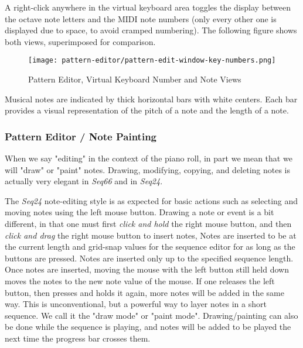    A right-click anywhere in the virtual keyboard area toggles the display
   between the octave note letters and the MIDI note numbers (only every other
   one is displayed due to space, to avoid cramped numbering).
   The following figure shows both views, superimposed for comparison.

\begin{figure}[H]
   \centering 
   \texttt{[image: pattern-editor/pattern-edit-window-key-numbers.png]}
   \caption{Pattern Editor, Virtual Keyboard Number and Note Views}
   \label{fig:pattern_editor_key_numbers}
\end{figure}

   Musical notes are indicated by thick horizontal bars with white
   centers.  Each bar provides
   a visual representation of the pitch of a note and the length of a note.

\subsubsection{Pattern Editor / Note Painting}
\label{subsubsec:pattern_editor_note_painting}

   When we say "editing" in the context of the piano roll, in part we mean that
   we will "draw"
   or "paint"
    notes.
   Drawing, modifying, copying, and deleting
   notes is actually very elegant in \textsl{Seq66} and in
   \textsl{Seq24}.

   The \textsl{Seq24} note-editing style is as expected for basic
   actions such as selecting and moving notes using the left mouse button.
   Drawing a note or event is a bit different, in that one must first
   \textsl{click and hold} the right mouse button, and then
   \textsl{click and drag} the right mouse button to insert notes,
   Notes are inserted to be at the current length and grid-snap values for
   the sequence editor for as long as the buttons are pressed.
   Notes are inserted only up to the specified sequence length.
   Once notes are inserted, moving the mouse with the left button still
   held down moves the notes to the new note value of the mouse.
   If one releases the left button, then presses and holds it again,
   more notes will be added in the same way.
   This is unconventional, but a powerful way to layer notes in a short
   sequence.
   We call it the
   "draw mode" or
   "paint mode".
   Drawing/painting can also be done while the sequence is playing,
   and notes will be added to be played the next time the progress bar crosses
   them.


